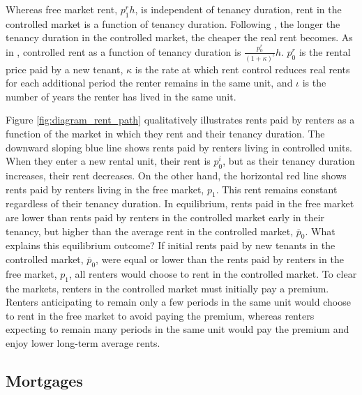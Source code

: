 \documentclass[parskip=full]{article}
\begin{document}
Whereas free market rent, $p^{r}_{1}h$, is independent of tenancy duration, rent in the controlled market is a function of tenancy duration. Following \citet{fmn-2022}, the longer the tenancy duration in the controlled market, the cheaper the real rent becomes. As in \citet{fmn-2022}, controlled rent as a function of tenancy duration is $\frac{p^{r}_{0}}{(1+\kappa)^{\iota}} h$. $p^{r}_{0}$ is the rental price paid by a new tenant, $\kappa$ is the rate at which rent control reduces real rents for each additional period the renter remains in the same unit, and $\iota$ is the number of years the renter has lived in the same unit. 

Figure \ref{fig:diagram_rent_path} qualitatively illustrates rents paid by renters as a function of the market in which they rent and their tenancy duration. The downward sloping blue line shows rents paid by renters living in controlled units. When they enter a new rental unit, their rent is $p^{i}_{0}$, but as their tenancy duration increases, their rent decreases. On the other hand, the horizontal red line shows rents paid by renters living in the free market, $p_{1}$. This rent remains constant regardless of their tenancy duration. In equilibrium, rents paid in the free market are lower than rents paid by renters in the controlled market early in their tenancy, but higher than the average rent in the controlled market, $\overline{p}_{0}$. What explains this equilibrium outcome? If initial rents paid by new tenants in the controlled market, $\overline{p}_{0}$, were equal or lower than the rents paid by renters in the free market, $p_{1}$, all renters would choose to rent in the controlled market. To clear the markets, renters in the controlled market must initially pay a premium. Renters anticipating to remain only a few periods in the same unit would choose to rent in the free market to avoid paying the premium, whereas renters expecting to remain many periods in the same unit would pay the premium and enjoy lower long-term average rents.

\subsection{Mortgages}\label{subsection:morgtages}
\end{document}
